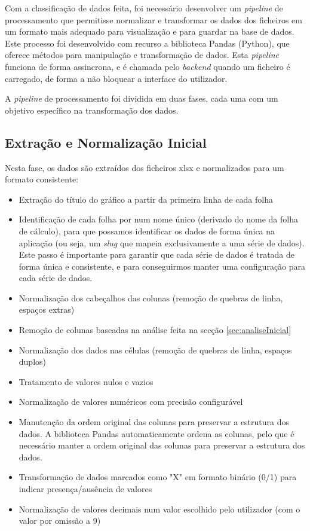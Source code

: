 Com a classificação de dados feita, foi necessário desenvolver um \textit{pipeline} de processamento que permitisse normalizar e transformar os dados dos ficheiros em um formato mais adequado para visualização e para guardar na base de dados. Este processo foi desenvolvido com recurso a biblioteca Pandas (Python), que oferece métodos para manipulação e transformação de dados. Esta \textit{pipeline} funciona de forma assincrona, e é chamada pelo \textit{backend} quando um ficheiro é carregado, de forma a não bloquear a interface do utilizador.

A \textit{pipeline} de processamento foi dividida em duas fases, cada uma com um objetivo específico na transformação dos dados.

\subsection{Extração e Normalização Inicial}

Nesta fase, os dados são extraídos dos ficheiros \gls{xlsx} e normalizados para um formato consistente:

\begin{itemize}
    \item Extração do título do gráfico a partir da primeira linha de cada folha
    \item Identificação de cada folha por num nome único (derivado do nome da folha de cálculo), para que possamos identificar os dados de forma única na aplicação (ou seja, um \textit{slug} que mapeia exclusivamente a uma série de dados). Este passo é importante para garantir que cada série de dados é tratada de forma única e consistente, e para conseguirmos manter uma configuração para cada série de dados.
    \item Normalização dos cabeçalhos das colunas (remoção de quebras de linha, espaços extras)
    \item Remoção de colunas baseadas na análise feita na secção \ref{sec:analiseInicial}
    \item Normalização dos dados nas células (remoção de quebras de linha, espaços duplos)
    \item Tratamento de valores nulos e vazios
    \item Normalização de valores numéricos com precisão configurável
    \item Manutenção da ordem original das colunas para preservar a estrutura dos dados. A biblioteca Pandas automaticamente ordena as colunas, pelo que é necessário manter a ordem original das colunas para preservar a estrutura dos dados.
    \item Transformação de dados marcados como "X" em formato binário (0/1) para indicar presença/ausência de valores
    \item Normalização de valores decimais num valor escolhido pelo utilizador (com o valor por omissão a 9)
\end{itemize}


